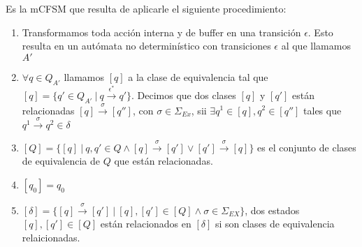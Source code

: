 \begin{definition}\label{def:interfazAFCA} Es la mCFSM que resulta de aplicarle el siguiente procedimiento:
\begin{enumerate}
    \item Transformamos toda acción interna y de buffer en una transición $\epsilon$. Esto resulta en un autómata no determinístico con transiciones $\epsilon$ al que llamamos $A'$
    \item $\forall q \in Q_{A'}$ llamamos $[q]$ a la clase de equivalencia tal que $[q]=\{q' \in Q_{A'}\ |\ q \xrightarrow{\epsilon^*} q'\}$. Decimos que dos clases $[q]$ y $[q']$ están relacionadas $[q] \xrightarrow{\sigma} [q'']$, con $\sigma \in \Sigma_{Ex}$, sii $\exists q^1 \in [q], q^2 \in [q'']$ tales que $q^1 \xrightarrow{\sigma} q^2 \in \delta$
    \item $[Q]= \{[q] \ | \ q, q' \in Q \land [q] \xrightarrow{\sigma} [q'] \lor [q'] \xrightarrow{\sigma} [q] \}$ es el conjunto de clases de equivalencia de $Q$ que están relacionadas. 
    \item $[q_0]=q_0$
    \item $[\delta]= \{[q] \xrightarrow{\sigma} [q']\ |\ [q], [q'] \in [Q] \land \sigma \in \Sigma_{EX}\}$, dos estados $[q],[q'] \in [Q]$ están relacionados en $[\delta]$ si son clases de equivalencia relaicionadas. 
\end{enumerate}
\end{definition}

